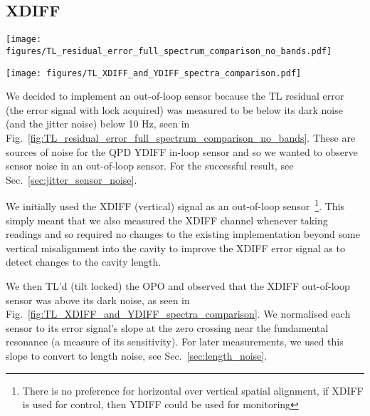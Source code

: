 \documentclass[aps,pra,superscriptaddress,reprint,nofootinbib]{revtex4-1}
\begin{document}
\subsection{XDIFF}

\begin{figure*}
\texttt{[image: figures/TL\_residual\_error\_full\_spectrum\_comparison\_no\_bands.pdf]}
\caption{SR785 measurements from 2020-12-23 of the TL YDIFF residual error (blue) compared against its dark noise (orange) and jitter noise (green).}
\label{fig:TL_residual_error_full_spectrum_comparison_no_bands}
\end{figure*}

\begin{figure*}
\texttt{[image: figures/TL\_XDIFF\_and\_YDIFF\_spectra\_comparison.pdf]}
\caption{SR785 measurements from 2021-01-06 comparing the XDIFF and YDIFF residual errors against their dark noises while TL’d against YDIFF. We see that the YDIFF goes below the dark noise below 10 Hz but that the XDIFF remains above dark noise throughout. The residual errors are normalised to the gradient at the zero crossing in the scanned cavity error signal, i.e.\ normalised to the sensitivity of each sensor.}
\label{fig:TL_XDIFF_and_YDIFF_spectra_comparison}
\end{figure*}

We decided to implement an out-of-loop sensor because the TL residual error (the error signal with lock acquired) was measured to be below its dark noise (and the jitter noise) below 10 Hz, seen in Fig.~\ref{fig:TL_residual_error_full_spectrum_comparison_no_bands}. These are sources of noise for the QPD YDIFF in-loop sensor and so we wanted to observe sensor noise in an out-of-loop sensor. For the successful result, see Sec.~\ref{sec:jitter_sensor_noise}.

We initially used the XDIFF (vertical) signal as an out-of-loop sensor~\footnote{There is no preference for horizontal over vertical spatial alignment, if XDIFF is used for control, then YDIFF could be used for monitoring}. This simply meant that we also measured the XDIFF channel whenever taking readings and so required no changes to the existing implementation beyond some vertical misalignment into the cavity to improve the XDIFF error signal as to detect changes to the cavity length.

We then TL’d (tilt locked) the OPO and observed that the XDIFF out-of-loop sensor was above its dark noise, as seen in Fig.~\ref{fig:TL_XDIFF_and_YDIFF_spectra_comparison}. We normalised each sensor to its error signal’s slope at the zero crossing near the fundamental resonance (a measure of its sensitivity). For later measurements, we used this slope to convert to length noise, see Sec.~\ref{sec:length_noise}.
\end{document}
